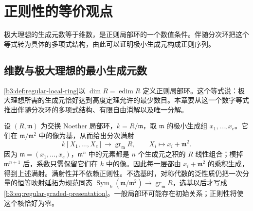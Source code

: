 
\section{正则性的等价观点}
\label{b3:sec:1801}

极大理想的生成元数等于维数，是正则局部环的一个数值条件。伴随分次环把这个等式转为具体的多项式结构，由此可以证明极小生成元构成正则序列。

%
%

\subsection{维数与极大理想的最小生成元数}
\label{b3:subsec:1801:01}

\cref{b3:def:regular-local-ring}以 \(\dim R=\operatorname{edim}R\) 定义正则局部环。这个等式说：极大理想所需的生成元恰好达到高度定理允许的最少数目。本章要从这一个数字等式推出伴随分次环的多项式结构、有限自由消解以及唯一分解。

\ProseParagraphBreak
设 \((R,\mathfrak m)\) 为交换 Noether 局部环，\(k=R/\mathfrak m\)，取 \(\mathfrak m\) 的极小生成组 \(x_1,\ldots,x_e\)。它们在 \(\mathfrak m/\mathfrak m^2\) 中的像为基，从而给出分次满射
\begin{equation}\label{b3:eq:regular-graded-presentation}
	k[X_1,\ldots,X_e]\longrightarrow\operatorname{gr}_{\mathfrak m}R, \qquad X_i\longmapsto x_i+\mathfrak m^2.
\end{equation}
因为 \(\mathfrak m=(x_1,\ldots,x_e)\)，\(\mathfrak m^n\) 中的元素都是 \(n\) 个生成元之积的 \(R\) 线性组合；模掉 \(\mathfrak m^{n+1}\) 后，系数只需保留它们在 \(k\) 中的像。因此每一层都由 \(x_i+\mathfrak m^2\) 的乘积生成，得到上述满射。满射性并不依赖正则性。不选基时，对称代数的泛性质仍把一次分量的恒等映射延拓为规范同态 \(\operatorname{Sym}_k(\mathfrak m/\mathfrak m^2)\to\operatorname{gr}_{\mathfrak m}R\)，选基以后才写成\eqref{b3:eq:regular-graded-presentation}。一般局部环可能存在初始关系；正则性将使这个核恰好为零。

